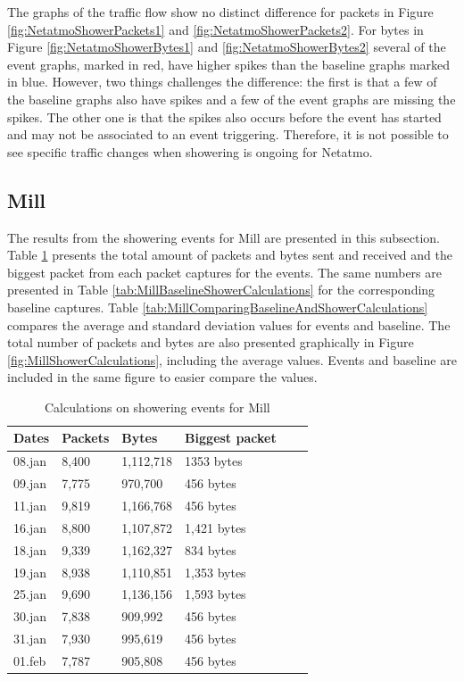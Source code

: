 The graphs of the traffic flow show no distinct difference for packets in Figure \ref{fig:NetatmoShowerPackets1} and \ref{fig:NetatmoShowerPackets2}. For bytes in Figure \ref{fig:NetatmoShowerBytes1} and \ref{fig:NetatmoShowerBytes2} several of the event graphs, marked in red, have higher spikes than the baseline graphs marked in blue. However, two things challenges the difference: the first is that a few of the baseline graphs also have spikes and a few of the event graphs are missing the spikes. The other one is that the spikes also occurs before the event has started and may not be associated to an event triggering. Therefore, it is not possible to see specific traffic changes when showering is ongoing for Netatmo. 

\newpage
\subsection{Mill}
The results from the showering events for Mill are presented in this subsection. Table \ref{tab:MillShowerCalculations} presents the total amount of packets and bytes sent and received and the biggest packet from each packet captures for the events. The same numbers are presented in Table \ref{tab:MillBaselineShowerCalculations} for the corresponding baseline captures. Table \ref{tab:MillComparingBaselineAndShowerCalculations} compares the average and standard deviation values for events and baseline. The total number of packets and bytes are also presented graphically in Figure \ref{fig:MillShowerCalculations}, including the average values. Events and baseline are included in the same figure to easier compare the values. 

\begin{table}[H]
    \centering
    \caption{Calculations on showering events for Mill}
    \begin{tabular}{|l|l|l|l|l|l|}
    \hline
        \textbf{Dates} & \textbf{Packets} & \textbf{Bytes} & \textbf{Biggest packet} \\ \hline
        08.jan & 8,400 & 1,112,718 & 1353 bytes   \\ \hline
        09.jan & 7,775 & 970,700   & 456 bytes   \\ \hline
        11.jan & 9,819 & 1,166,768 & 456 bytes   \\ \hline
        16.jan & 8,800 & 1,107,872 & 1,421 bytes \\ \hline
        18.jan & 9,339 & 1,162,327 & 834 bytes   \\ \hline
        19.jan & 8,938 & 1,110,851 & 1,353 bytes \\ \hline
        25.jan & 9,690 & 1,136,156 & 1,593 bytes \\ \hline
        30.jan & 7,838 & 909,992   & 456 bytes  \\ \hline
        31.jan & 7,930 & 995,619   & 456 bytes \\ \hline
        01.feb & 7,787 & 905,808   & 456 bytes \\ \hline
    \end{tabular}
    \label{tab:MillShowerCalculations}
\end{table}

